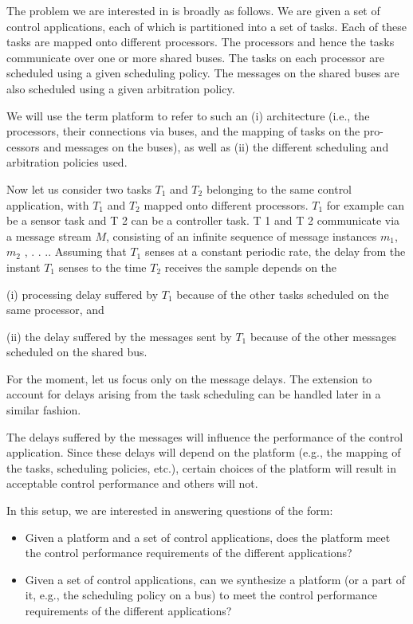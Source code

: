 



















The problem we are interested in is broadly as follows. We are given a set
of control applications, each of which is partitioned into a set of tasks. Each of
these tasks are mapped onto different processors. The processors and hence the
tasks communicate over one or more shared buses. The tasks on each processor
are scheduled using a given scheduling policy. The messages on the shared buses
are also scheduled using a given arbitration policy.

We will use the term platform to refer to such an (i) architecture (i.e., the
processors, their connections via buses, and the mapping of tasks on the pro-
cessors and messages on the buses), as well as (ii) the different scheduling and
arbitration policies used.

Now let us consider two tasks $T_1$ and $T_2$ belonging to the same control
application, with $T_1$ and $T_2$ mapped onto different processors. $T_1$ for example
can be a sensor task and T 2 can be a controller task. T 1 and T 2 communicate
via a message stream $M$, consisting of an infinite sequence of message instances
$m_1$, $m_2$ , . . .. Assuming that $T_1$ senses at a constant periodic rate, the delay
from the instant $T_1$ senses to the time $T_2$ receives the sample depends on the

(i) processing delay suffered by $T_1$ because of the other tasks scheduled on the
same processor, and 

(ii) the delay suffered by the messages sent by $T_1$ because
of the other messages scheduled on the shared bus.

For the moment, let us focus only on the message delays. The extension to
account for delays arising from the task scheduling can be handled later in a
similar fashion.

The delays suffered by the messages will influence the performance of the
control application. Since these delays will depend on the platform (e.g., the
mapping of the tasks, scheduling policies, etc.), certain choices of the platform
will result in acceptable control performance and others will not.

In this setup, we are interested in answering questions of the form:
\begin{itemize}
 \item Given a platform and a set of control applications, does the platform meet
the control performance requirements of the different applications?
 \item  Given a set of control applications, can we synthesize a platform (or a part
of it, e.g., the scheduling policy on a bus) to meet the control performance
requirements of the different applications?
\end{itemize}

